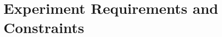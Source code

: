 \pagebreak
\section{Experiment Requirements and Constraints}

\pagebreak

\pagebreak

\pagebreak

\pagebreak


